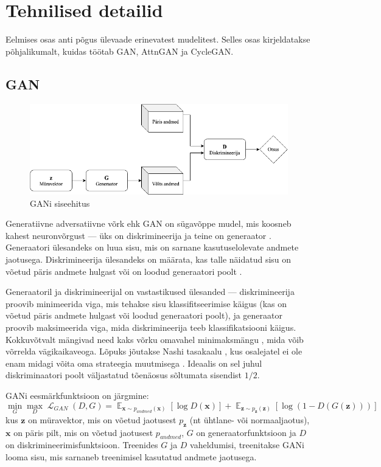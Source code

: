 \documentclass{vilgym}
\DeclareMathOperator{\EX}{\mathbb{E}}
\DeclareMathOperator{\loss}{\mathcal{L}}
\begin{document}
	\section{Tehnilised detailid}
	Eelmises osas anti põgus ülevaade erinevatest mudelitest. Selles osas kirjeldatakse põhjalikumalt, kuidas töötab GAN, AttnGAN ja CycleGAN.

	\subsection{GAN}
	\begin{figure}[t]
		\centering
		\includegraphics[width=\linewidth]{images/gan.png}
		\caption{GANi siseehitus}
		\label{fig:gan}
	\end{figure}

	Generatiivne adversatiivne võrk ehk GAN  on sügavõppe mudel, mis koosneb kahest neuronvõrgust --- üks on diskrimineerija  ja teine on generaator .  Generaatori ülesandeks on luua sisu, mis on sarnane kasutuselolevate andmete jaotusega. Diskrimineerija ülesandeks on määrata, kas talle näidatud sisu on võetud päris andmete hulgast või on loodud generaatori poolt .
	
	Generaatoril ja diskrimineerijal on vastastikused ülesanded --- diskrimineerija proovib minimeerida viga, mis tehakse sisu klassifitseerimise käigus (kas on võetud päris andmete hulgast või loodud generaatori poolt), ja generaator proovib maksimeerida viga, mida diskrimineerija teeb klassifikatsiooni käigus. Kokkuvõtvalt mängivad need kaks võrku omavahel minimaksmängu , mida võib võrrelda vägikaikaveoga. Lõpuks jõutakse Nashi tasakaalu , kus osalejatel ei ole enam midagi võita oma strateegia muutmisega \parencite{gametheory}. Ideaalis on sel juhul diskriminaatori poolt väljastatud tõenäosus sõltumata sisendist $ 1/2 $.

	GANi eesmärkfunktsioon on järgmine:
	\begin{equation} \label{eq:gan}
		\operatorname*{min}_G \operatorname*{max}_D \loss_{GAN}(D,G) = \EX_{\boldsymbol{x}\sim p_{andmed}(\boldsymbol{x})}[\log D(\boldsymbol{x})] + \EX_{\boldsymbol{z}\sim p_{\boldsymbol{z}}(\boldsymbol{z})}[\log(1-D(G(\boldsymbol{z})))]
	\end{equation}
	kus $ \boldsymbol{z} $ on müravektor, mis on võetud jaotusest $ p_{\boldsymbol{z}} $ (nt ühtlane- või normaaljaotus), $ \boldsymbol{x} $ on päris pilt, mis on võetud jaotusest $ p_{andmed} $, $ G $ on generaatorfunktsioon ja $ D $ on diskrimineerimisfunktsioon. Treenides $ G $ ja $ D $ vaheldumisi, treenitakse GANi looma sisu, mis sarnaneb treenimisel kasutatud andmete jaotusega. \parencite{gan}
\end{document}
